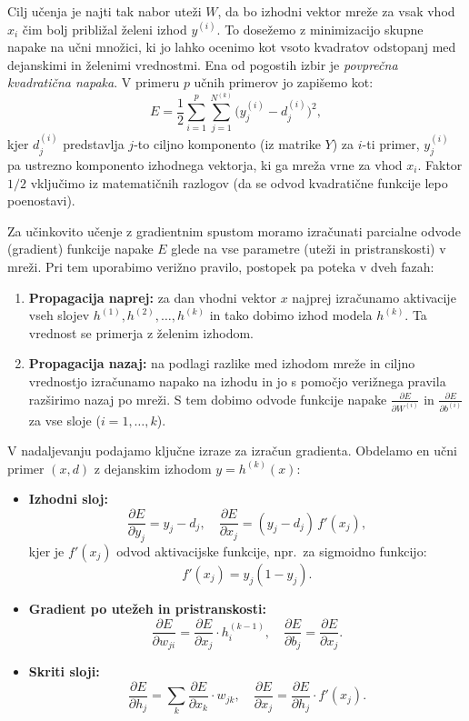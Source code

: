 Cilj učenja je najti tak nabor uteži $W$, da bo izhodni vektor mreže za vsak vhod $x_i$ čim bolj približal želeni izhod $y^{(i)}$. To dosežemo z minimizacijo skupne napake na učni množici, ki jo lahko ocenimo kot vsoto kvadratov odstopanj med dejanskimi in želenimi vrednostmi. Ena od pogostih izbir je \textit{povprečna kvadratična napaka}. V primeru $p$ učnih primerov jo zapišemo kot:
\[
E = \frac{1}{2} \sum_{i=1}^{p} \sum_{j=1}^{N^{(k)}} \big(y_{j}^{(i)} - d_{j}^{(i)}\big)^2,
\] 
kjer $d_{j}^{(i)}$ predstavlja $j$-to ciljno komponento (iz matrike $Y$) za $i$-ti primer, $y_{j}^{(i)}$ pa ustrezno komponento izhodnega vektorja, ki ga mreža vrne za vhod $x_i$. Faktor $1/2$ vključimo iz matematičnih razlogov (da se odvod kvadratične funkcije lepo poenostavi).

Za učinkovito učenje z gradientnim spustom moramo izračunati parcialne odvode (gradient) funkcije napake $E$ glede na vse parametre (uteži in pristranskosti) v mreži. Pri tem uporabimo verižno pravilo, postopek pa poteka v dveh fazah:
\begin{enumerate}
  \item \textbf{Propagacija naprej:} za dan vhodni vektor $x$ najprej izračunamo aktivacije vseh slojev $h^{(1)}, h^{(2)}, \dots, h^{(k)}$ in tako dobimo izhod modela $h^{(k)}$. Ta vrednost se primerja z želenim izhodom.
  \item \textbf{Propagacija nazaj:} na podlagi razlike med izhodom mreže in ciljno vrednostjo izračunamo napako na izhodu in jo s pomočjo verižnega pravila razširimo nazaj po mreži. S tem dobimo odvode funkcije napake $\frac{\partial E}{\partial W^{(i)}}$ in $\frac{\partial E}{\partial b^{(i)}}$ za vse sloje ($i = 1, \dots, k$). 
\end{enumerate}

V nadaljevanju podajamo ključne izraze za izračun gradienta. Obdelamo en učni primer $(x, d)$ z dejanskim izhodom $y = h^{(k)}(x)$:

\begin{itemize}
  \item \textbf{Izhodni sloj:}
  \[
  \frac{\partial E}{\partial y_j} = y_j - d_j,
  \quad
  \frac{\partial E}{\partial x_j} = (y_j - d_j)\, f'(x_j),
  \]
  kjer je $f'(x_j)$ odvod aktivacijske funkcije, npr.\ za sigmoidno funkcijo:
  \[
  f'(x_j) = y_j (1 - y_j).
  \]

  \item \textbf{Gradient po utežeh in pristranskosti:}
  \[
  \frac{\partial E}{\partial w_{ji}} = \frac{\partial E}{\partial x_j} \cdot h^{(k-1)}_i,
  \quad
  \frac{\partial E}{\partial b_j} = \frac{\partial E}{\partial x_j}.
  \]

  \item \textbf{Skriti sloji:}
  \[
  \frac{\partial E}{\partial h_j} = \sum_{k} \frac{\partial E}{\partial x_k} \cdot w_{jk},
  \quad
  \frac{\partial E}{\partial x_j} = \frac{\partial E}{\partial h_j} \cdot f'(x_j).
  \]
\end{itemize}

